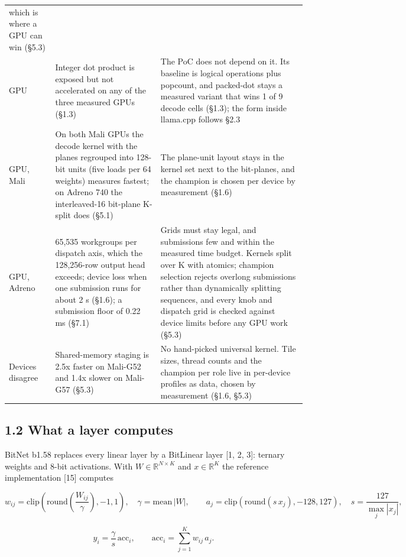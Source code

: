 \documentclass[
  10pt,
]{article}
\begin{document}
{\begin{longtable}[]{@{}p{2.2cm}p{5.9cm}p{7.9cm}@{}}
which is where a GPU can win (\S{}5.3) \\
GPU & Integer dot product is exposed but not accelerated on any of the
three measured GPUs (\S{}1.3) & The PoC does not depend on it. Its
baseline is logical operations plus popcount, and packed-dot stays a
measured variant that wins 1 of 9 decode cells (\S{}1.3); the form
inside llama.cpp follows \S{}2.3 \\
GPU, Mali & On both Mali GPUs the decode kernel with the planes
regrouped into 128-bit units (five loads per 64 weights) measures
fastest; on Adreno 740 the interleaved-16 bit-plane K-split does
(\S{}5.1) & The plane-unit layout stays in the kernel set next to the
bit-planes, and the champion is chosen per device by measurement
(\S{}1.6) \\
GPU, Adreno & 65,535 workgroups per dispatch axis, which the 128,256-row
output head exceeds; device loss when one submission runs for about 2 s
(\S{}1.6); a submission floor of 0.22 ms (\S{}7.1) & Grids must stay
legal, and submissions few and within the measured time budget. Kernels
split over K with atomics; champion selection rejects overlong
submissions rather than dynamically splitting sequences, and every knob
and dispatch grid is checked against device limits before any GPU work
(\S{}5.3) \\
Devices disagree & Shared-memory staging is 2.5x faster on Mali-G52 and
1.4x slower on Mali-G57 (\S{}5.3) & No hand-picked universal kernel.
Tile sizes, thread counts and the champion per role live in per-device
profiles as data, chosen by measurement (\S{}1.6, \S{}5.3) \\
\end{longtable}
}

\subsection{1.2 What a layer computes}\label{what-a-layer-computes}

BitNet b1.58 replaces every linear layer by a BitLinear layer [1, 2,
3]: ternary weights and 8-bit activations. With
\(W \in\mathbb{R}^{N \times K}\) and \(x \in\mathbb{R}^{K}\) the
reference implementation [15] computes

\[
w_{ij} = \mathrm{clip}\left(\mathrm{round}\left(\frac{W_{ij}}{\gamma}\right), -1, 1\right),
\quad\gamma= \mathrm{mean}\,|W|, \qquad
a_j = \mathrm{clip}(\mathrm{round}(s\,x_j), -128, 127), \quad s = \frac{127}{\max_j |x_j|},
\]

\[
y_i = \frac{\gamma}{s}\,\mathrm{acc}_i, \qquad\mathrm{acc}_i = \sum_{j=1}^{K} w_{ij}\,a_j .
\]
\end{document}
